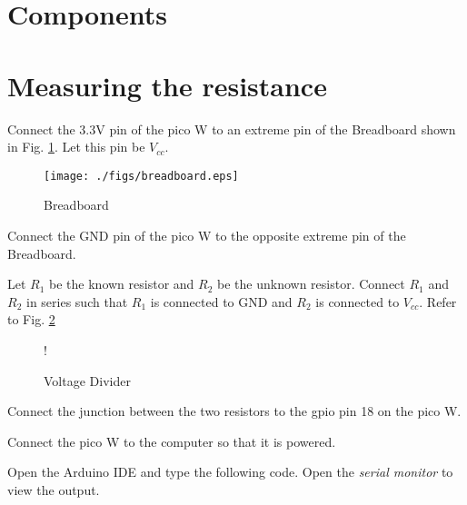 \documentclass[journal,12pt,twocolumn]{IEEEtran}
\begin{document}




\begin{abstract}
Through this manual, we learn how to measure an unknown resistance through pico W and display it on an LCD.
\end{abstract}
\section{Components}

\section{Measuring the resistance}
\begin{problem}
Connect the 3.3V pin of the pico W to an extreme pin of the Breadboard shown in Fig. \ref{fig:breadboard}.  Let this pin be $V_{cc}$.
\end{problem}
%
%
\begin{figure}
\centering
\texttt{[image: ./figs/breadboard.eps]}
\caption{Breadboard}
\label{fig:breadboard}
\end{figure}
%
\begin{problem}
Connect the GND pin of the pico W to the opposite extreme pin of the Breadboard.
\end{problem}
%
%
\begin{problem}
Let $R_1$ be the known resistor and $R_2$ be the unknown resistor.  Connect $R_1$ and $R_2$ in series such that $R_1$ is connected
to GND and $R_2$ is connected to $V_{cc}$. Refer to Fig. \ref{fig:voltage_divider}
\end{problem}
%
%
\begin{figure}
\centering
\resizebox {\columnwidth} {!} {
%

}
%
\caption{Voltage Divider}
\label{fig:voltage_divider}
\end{figure}
%

\begin{problem}
Connect the junction between the two resistors to  the gpio pin 18  on the pico W.
\end{problem}
%
\begin{problem}
Connect the pico W to the computer so that it is powered.
\end{problem}
%
\begin{problem}
Open the Arduino IDE and type the following code.  Open the {\em serial monitor} to view the output.
\end{problem}
%

%
\end{document}
